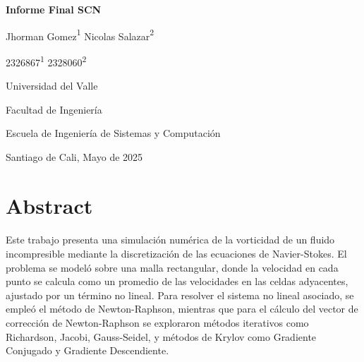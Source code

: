 \documentclass{article}
\begin{document}
  \begin{titlepage}
    \centering
    \vspace*{2cm}
    
    \Huge
    \textbf{Informe Final SCN}
    
    \vspace{1.5cm}
    
    \Large
    Jhorman Gomez{\textsuperscript{1}}
    Nicolas Salazar{\textsuperscript{2}}
    
    \vspace{0.5cm}
    
    \large

    2326867{\textsuperscript{1}}
    2328060{\textsuperscript{2}}
  
    
    \vspace{0.5cm}
    
    \Large
    Universidad del Valle
    
    \vspace{0.5cm}
    
    \large
    Facultad de Ingeniería
    
    \vspace{0.5cm}
    
    \large
    Escuela de Ingeniería de Sistemas y Computación
    
    \vspace{0.5cm}
    
    \large
    Santiago de Cali, Mayo de 2025
    
  \end{titlepage}

  \section*{Abstract}
  \paragraph{}
  Este trabajo presenta una simulación numérica de la vorticidad de un fluido incompresible mediante la discretización de las ecuaciones de Navier-Stokes. El problema se modeló sobre una malla rectangular, donde la velocidad en cada punto se calcula como un promedio de las velocidades en las celdas adyacentes, ajustado por un término no lineal. Para resolver el sistema no lineal asociado, se empleó el método de Newton-Raphson, mientras que para el cálculo del vector de corrección de Newton-Raphson se exploraron métodos iterativos como Richardson, Jacobi, Gauss-Seidel, y métodos de Krylov como Gradiente Conjugado y Gradiente Descendiente.
\end{document}
